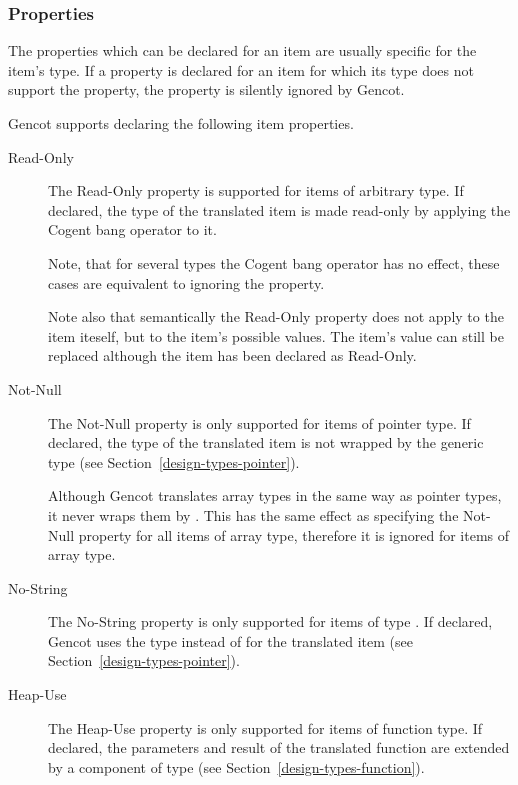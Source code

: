 \subsubsection{Properties}

The properties which can be declared for an item are usually specific for the item's type. If a property is declared
for an item for which its type does not support the property, the property is silently ignored by Gencot.

Gencot supports declaring the following item properties.

\begin{description}
\item[Read-Only]

The Read-Only property is supported for items of arbitrary type. If declared, the type of the translated item is
made read-only by applying the Cogent bang operator \code{!} to it.

Note, that for several types the Cogent bang operator has no effect, these cases are equivalent
to ignoring the property.

Note also that semantically the Read-Only property does not apply to the item iteself, but to the item's possible values.
The item's value can still be replaced although the item has been declared as Read-Only.

\item[Not-Null]

The Not-Null property is only supported for items of pointer type. If declared, the type of the translated item
is not wrapped by the generic  type (see Section~\ref{design-types-pointer}). 

Although Gencot translates array types in the same way as pointer types, it never wraps them by .
This has the same effect as specifying the Not-Null property for all items of array type, therefore it is ignored
for items of array type.

\item[No-String]

The No-String property is only supported for items of type . If declared, Gencot uses the  
type  instead of  for the translated item (see Section~\ref{design-types-pointer}).

\item[Heap-Use]

The Heap-Use property is only supported for items of function type. If declared, the parameters and
result of the translated function are extended by a component of type  (see Section~\ref{design-types-function}).


\end{description}

